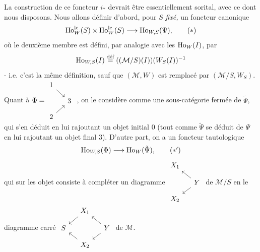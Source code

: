 La construction de ce foncteur $i_*$ devrait être essentiellement sorital, avec ce dont nous disposons. Nous allons définir d'abord, pour $S$ \textit{fixé,} un foncteur canonique
\[
\mathrm{Ho}^{\mathrm{lc}}_W(S) \times \mathrm{Ho}^{\mathrm{lc}}_W(S) \longrightarrow \mathrm{Ho}_{W,S}(\Psi), \tag*{$(*)$}
\]
où le deuxième membre est défini, par analogie avec les $\mathrm{Ho}_W(I)$, par
\[
\mathrm{Ho}_{W,S}(I) \overset{\text{déf}}{=} ((\mathcal{M}/S)(I))(W_S(I))^{-1}
\]
- i.e. c'est la même définition, sauf que $(\mathcal{M}, W)$ est remplacé par $(\mathcal{M}/S, W_S)$. Quant à $\Phi = \vcenter{\hbox{\begin{tikzcd}[ampersand replacement=\&, row sep=small, column sep=small]
1 \arrow[dr] \& \\
 \& 3 \\
2 \arrow[ur] \&
\end{tikzcd}}}$ , on le considère comme une sous-catégorie fermée de $\tilde{\Psi}$, qui s'en déduit en lui rajoutant un objet initial 0 (tout comme $\tilde{\Psi}$ se déduit de $\Psi$ en lui rajoutant un objet final 3). D'autre part, on a un foncteur tautologique
\[
\mathrm{Ho}_{W,S}(\Phi) \longrightarrow \mathrm{Ho}_W(\tilde{\Psi}), \tag*{$(*')$}
\]
qui sur les objet consiste à compléter un diagramme $\vcenter{\hbox{\begin{tikzcd}[ampersand replacement=\&, row sep=small, column sep=small] %
X_1 \& \\
 \& Y \arrow[ul] \arrow[dl] \\
X_2 \&
\end{tikzcd}}}$ de $\mathcal{M}/S$ en le diagramme carré $\vcenter{\hbox{\begin{tikzcd}[ampersand replacement=\&, row sep=small, column sep=small]
 \& X_1 \arrow[dl] \& \\
S \& \& Y \arrow[ul] \arrow[dl] \\
 \& X_2 \arrow[ul] \&
\end{tikzcd}}}$ de $\mathcal{M}$.

